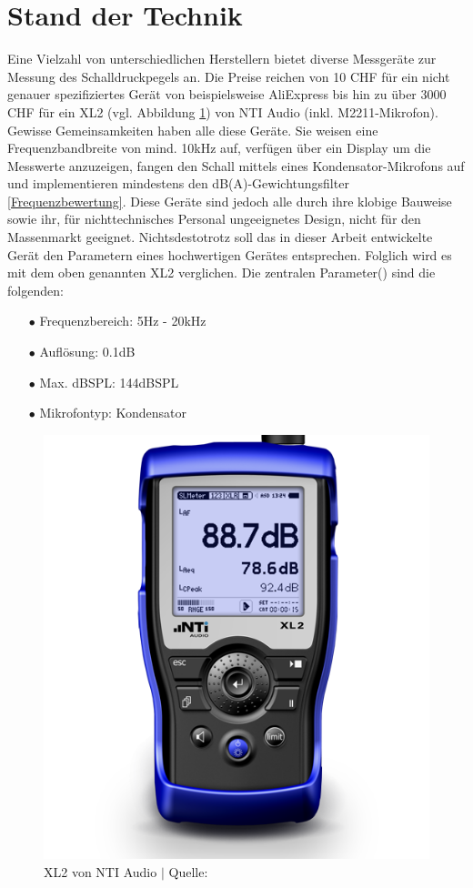 \documentclass[12pt]{article}
\begin{document}
	\newpage
	\section{Stand der Technik}\label{Stand}
	Eine Vielzahl von unterschiedlichen Herstellern bietet diverse Messgeräte zur Messung des Schalldruckpegels an. Die Preise  reichen von 10 CHF für ein nicht genauer spezifiziertes Gerät von beispielsweise AliExpress bis hin zu über 3000 CHF für ein XL2 (vgl. Abbildung \ref{fig:batnti-audio-xl2-500}) von NTI Audio (inkl. M2211-Mikrofon). Gewisse Gemeinsamkeiten haben alle diese Geräte. Sie weisen eine Frequenzbandbreite von mind. 10kHz auf, verfügen über ein Display um die Messwerte anzuzeigen, fangen den Schall mittels eines Kondensator-Mikrofons auf und implementieren mindestens den dB(A)-Gewichtungsfilter \ref{Frequenzbewertung}. Diese Geräte sind jedoch alle durch ihre klobige Bauweise sowie ihr, für nichttechnisches Personal ungeeignetes Design, nicht für den Massenmarkt geeignet. Nichtsdestotrotz soll das in dieser Arbeit entwickelte Gerät den Parametern eines hochwertigen Gerätes entsprechen. Folglich wird es mit dem oben genannten XL2 verglichen. Die zentralen Parameter(\cite{noauthor_xl2_nodate}) sind die folgenden:
	\begin{itemize}[topsep=10pt,partopsep=0pt,labelwidth=5cm,align=left,itemindent=5cm]
		\item[$\bullet$ Frequenzbereich:]  5Hz - 20kHz
		\item[$\bullet$ Auflösung:]  0.1dB
		\item[$\bullet$ Max. dBSPL:]  144dBSPL
		\item[$\bullet$ Mikrofontyp:]  Kondensator
	\end{itemize}
	\begin{figure}[H]
		\centering
		\includegraphics[width=0.4\linewidth]{images/BAT_NTi-Audio-XL2-500}
		\caption{XL2 von NTI Audio $\vert$ Quelle: \cite{noauthor_xl2_nodate}}
		\label{fig:batnti-audio-xl2-500}
	\end{figure}
		
\end{document}
